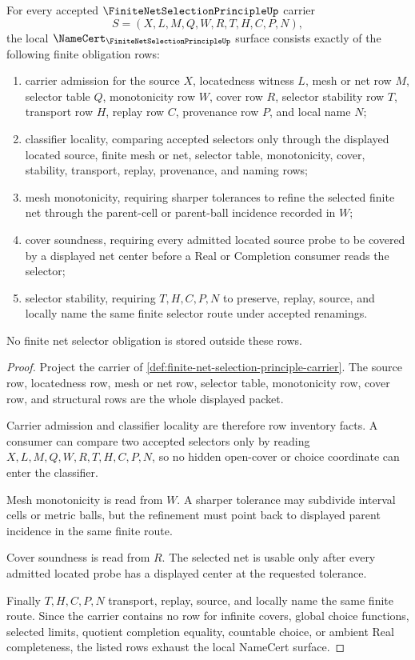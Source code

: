 \begin{theorem}
\label{thm:finite-net-selection-principle-obligation}
For every accepted $\FiniteNetSelectionPrincipleUp$ carrier
$$
S=(X,L,M,Q,W,R,T,H,C,P,N),
$$
the local $\NameCert_{\FiniteNetSelectionPrincipleUp}$ surface consists exactly of the following finite obligation rows:
\begin{enumerate}
\item carrier admission for the source $X$, locatedness witness $L$, mesh or net row $M$, selector table $Q$, monotonicity row $W$, cover row $R$, selector stability row $T$, transport row $H$, replay row $C$, provenance row $P$, and local name $N$;
\item classifier locality, comparing accepted selectors only through the displayed located source, finite mesh or net, selector table, monotonicity, cover, stability, transport, replay, provenance, and naming rows;
\item mesh monotonicity, requiring sharper tolerances to refine the selected finite net through the parent-cell or parent-ball incidence recorded in $W$;
\item cover soundness, requiring every admitted located source probe to be covered by a displayed net center before a Real or Completion consumer reads the selector;
\item selector stability, requiring $T,H,C,P,N$ to preserve, replay, source, and locally name the same finite selector route under accepted renamings.
\end{enumerate}
No finite net selector obligation is stored outside these rows.
\end{theorem}
\begin{proof}
Project the carrier of \autoref{def:finite-net-selection-principle-carrier}. The source row, locatedness row, mesh or net row, selector table, monotonicity row, cover row, and structural rows are the whole displayed packet.

Carrier admission and classifier locality are therefore row inventory facts. A consumer can compare two accepted selectors only by reading $X,L,M,Q,W,R,T,H,C,P,N$, so no hidden open-cover or choice coordinate can enter the classifier.

Mesh monotonicity is read from $W$. A sharper tolerance may subdivide interval cells or metric balls, but the refinement must point back to displayed parent incidence in the same finite route.

Cover soundness is read from $R$. The selected net is usable only after every admitted located probe has a displayed center at the requested tolerance.

Finally $T,H,C,P,N$ transport, replay, source, and locally name the same finite route. Since the carrier contains no row for infinite covers, global choice functions, selected limits, quotient completion equality, countable choice, or ambient Real completeness, the listed rows exhaust the local NameCert surface.
\end{proof}

